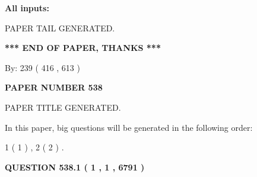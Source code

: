 \documentclass[12pt]{article}
\begin{document}
   
   
   
\noindent{}
   
   
   
   
\noindent\vspace{0.1in}\hspace{-0.08in} {\textbf{\Large{All inputs: }}}
   
   
   
   
   
   
 \vspace{0.2in}
 
   
   
\vspace{2.0in} PAPER TAIL GENERATED.
   
   
   
   
\vspace{1.0in} 
{\textbf{\large{ *** END OF PAPER, THANKS *** }}} 
   
   
\hspace{1.0in} By: 
 239 ( 416 ,  613 )
   
   
   
   
\newpage 
\setcounter{page}{ 
   538001 } 
   
   
   
   
 {\textbf{ \Large{ PAPER NUMBER  538  }}}
   
   
\vspace{0.2in}
   
   
   
   
   
   
   
   
 \vspace{0.2in}
 
 
 
 
   
   
 PAPER TITLE GENERATED.
   
   
   
\vspace{0.2in}
   
In this paper, big questions will be generated in the following order: 
   
   
   1 ( 1 )
 ,
   2 ( 2 )
 .
  
\vspace{0.2in}
  
{\textbf{\Large{QUESTION
538.1 
 ( 1 , 1 , 6791 )
}}}
  
\end{document}
